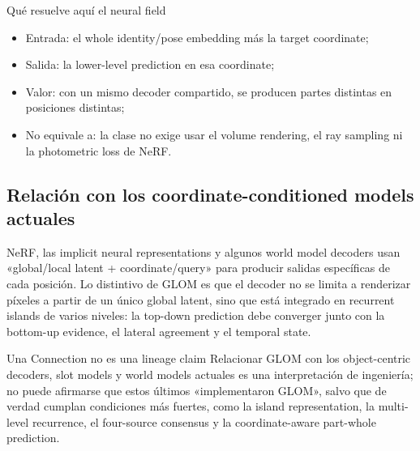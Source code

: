 \documentclass[a4paper]{article}
\begin{document}

\begin{knowledgebox}{Qué resuelve aquí el neural field}
\begin{itemize}
  \item Entrada: el whole identity/pose embedding más la target coordinate;
  \item Salida: la lower-level prediction en esa coordinate;
  \item Valor: con un mismo decoder compartido, se producen partes distintas en posiciones distintas;
  \item No equivale a: la clase no exige usar el volume rendering, el ray sampling ni la photometric loss de NeRF.
\end{itemize}
\end{knowledgebox}

\subsection{Relación con los coordinate-conditioned models actuales}

NeRF, las implicit neural representations y algunos world model decoders usan «global/local latent + coordinate/query» para producir salidas específicas de cada posición. Lo distintivo de GLOM es que el decoder no se limita a renderizar píxeles a partir de un único global latent, sino que está integrado en recurrent islands de varios niveles: la top-down prediction debe converger junto con la bottom-up evidence, el lateral agreement y el temporal state.

\begin{warningbox}{Una Connection no es una lineage claim}
Relacionar GLOM con los object-centric decoders, slot models y world models actuales es una interpretación de ingeniería; no puede afirmarse que estos últimos «implementaron GLOM», salvo que de verdad cumplan condiciones más fuertes, como la island representation, la multi-level recurrence, el four-source consensus y la coordinate-aware part-whole prediction.
\end{warningbox}
\end{document}

